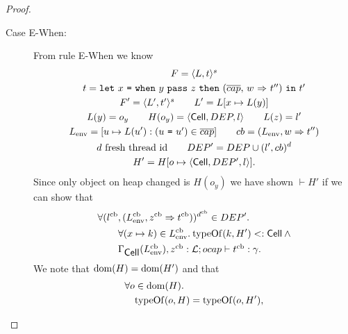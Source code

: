 \begin{proof}
\begin{description}
\begin{description}
\begin{description}
            \item[Case {\sc E-When}:] From rule {\sc E-When} we know
              \begin{equation}
                \begin{gathered}
                  F = \mbox{$\langle L, t \rangle^s$} \\ 
                  t = \mbox{\mdseries\texttt{let}~$x$~\texttt{=}~$\mbox{\mdseries\texttt{when}~$y$~\texttt{pass}~$z$~\texttt{then}~$\mbox{\mdseries($\overline{cap}$, $w$~$\Rightarrow$~$t''$)}$}$~\texttt{in}~$t'$} \\
                  F' = \mbox{$\langle L', t' \rangle^s$} \quad\quad L' = L[x \mapsto L(y)] \\
                  L(y) = o_y \quad\quad H(o_y) = \mbox{$\langle \mbox{$\mathsf{Cell}$}{}, DEP, l \rangle$} \quad\quad L(z) = l' \\
                  L_{\text{env}} = [u \mapsto L(u'): (\mbox{\mdseries$u$~\texttt{=}~$u'$}) \in
                  \overline{cap}] \quad\quad cb = (L_{\text{env}}, w \Rightarrow
                  t'') \\
                  d \text{ fresh thread id} \quad\quad DEP' = DEP \cup (l', cb)^d
                  \\
                  H' = H[o \mapsto \mbox{$\langle \mbox{$\mathsf{Cell}$}{}, DEP', l \rangle$}].
                \end{gathered}
              \end{equation}
              Since only object on heap changed is $H(o_y)$ we have shown
              $\vdash H'$ if we can show that
              \begin{equation}
                \begin{aligned}
                  \forall (l^{\text{cb}}&, (L^{\text{cb}}_{\text{env}}, z^{\text{cb}} \Rightarrow t^{\text{cb}}))^{d^{\text{cb}}} \in
                  DEP'. \\
                  &\forall (x \mapsto k) \in L^{\text{cb}}_{\text{env}}.\: \mbox{$\mathrm{typeOf}$}{(k, H')} <:
                  \mbox{$\mathsf{Cell}$} \: \land \\
                  &\mbox{$\Gamma_{\mbox{$\mathsf{Cell}$}{}}(L^{\text{cb}}_{\text{env}}), z^{\text{cb}}:
                  \mbox{$\mathcal{L}$};\mbox{$ocap$}\vdash t^{\text{cb}}:\gamma$} .
                \end{aligned}
              \end{equation}
              We note that $\mbox{$\mathrm{dom}$}(H) = \mbox{$\mathrm{dom}$}(H')$ and that
              \begin{equation}
                \begin{aligned}
                  \forall o &\in \mbox{$\mathrm{dom}$}(H).  \\
                    &\mbox{$\mathrm{typeOf}$}(o, H) = \mbox{$\mathrm{typeOf}$}(o, H'),
                \end{aligned}
              \end{equation}

\end{description}
\end{description}
\end{description}
\end{proof}
